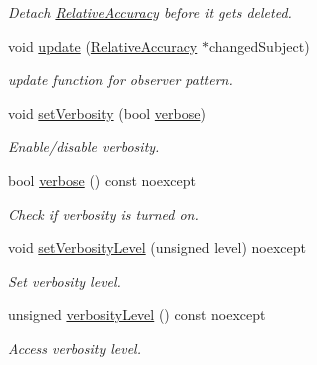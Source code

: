 \begin{DoxyCompactItemize}
\begin{DoxyCompactList}\small\item\em Detach \hyperlink{classSpacy_1_1Mixin_1_1RelativeAccuracy}{Relative\+Accuracy} before it gets deleted. \end{DoxyCompactList}\item 
\hypertarget{classSpacy_1_1Mixin_1_1RelativeAccuracy_acf0b58224d9a2879d05b5d2947f37527}{}void \hyperlink{classSpacy_1_1Mixin_1_1RelativeAccuracy_acf0b58224d9a2879d05b5d2947f37527}{update} (\hyperlink{classSpacy_1_1Mixin_1_1RelativeAccuracy_ad843319a8782b47291fa31334e8bbd2a_ad843319a8782b47291fa31334e8bbd2a}{Relative\+Accuracy} $\ast$changed\+Subject)\label{classSpacy_1_1Mixin_1_1RelativeAccuracy_acf0b58224d9a2879d05b5d2947f37527}

\begin{DoxyCompactList}\small\item\em update function for observer pattern. \end{DoxyCompactList}\item 
void \hyperlink{classSpacy_1_1Mixin_1_1Verbosity_a0365d293ab27e27da9496c668020aefb_a0365d293ab27e27da9496c668020aefb}{set\+Verbosity} (bool \hyperlink{classSpacy_1_1Mixin_1_1Verbosity_ad367a7328578546938fd2a7e52ab3793_ad367a7328578546938fd2a7e52ab3793}{verbose})
\begin{DoxyCompactList}\small\item\em Enable/disable verbosity. \end{DoxyCompactList}\item 
bool \hyperlink{classSpacy_1_1Mixin_1_1Verbosity_ad367a7328578546938fd2a7e52ab3793_ad367a7328578546938fd2a7e52ab3793}{verbose} () const noexcept
\begin{DoxyCompactList}\small\item\em Check if verbosity is turned on. \end{DoxyCompactList}\item 
void \hyperlink{classSpacy_1_1Mixin_1_1Verbosity_af84a4b3c933f252a5840ab63d4a38325_af84a4b3c933f252a5840ab63d4a38325}{set\+Verbosity\+Level} (unsigned level) noexcept
\begin{DoxyCompactList}\small\item\em Set verbosity level. \end{DoxyCompactList}\item 
unsigned \hyperlink{classSpacy_1_1Mixin_1_1Verbosity_a2131f495d276c95d2d6534a6dfce6f9f_a2131f495d276c95d2d6534a6dfce6f9f}{verbosity\+Level} () const noexcept
\begin{DoxyCompactList}\small\item\em Access verbosity level. \end{DoxyCompactList}\item 

\end{DoxyCompactItemize}
